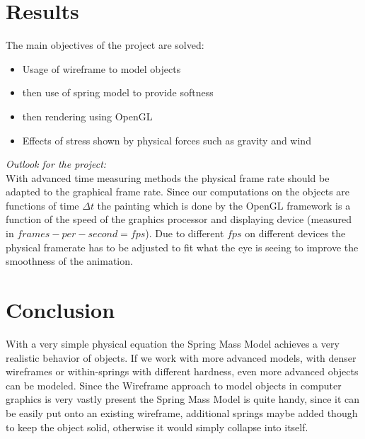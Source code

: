 \documentclass[11pt]{article}
\begin{document}
\section{Results}
The main objectives of the project are solved:
\begin{itemize}
\item{Usage of wireframe to model objects}
\item{then use of spring model to provide softness}
\item{then rendering using OpenGL}
\item{Effects of stress shown by physical forces such as gravity and wind}
\end{itemize}

\textit{Outlook for the project:}\\
With advanced time measuring methods the physical frame rate should be adapted to the graphical frame rate. Since our computations on the objects are functions of time $\Delta t$ the painting which is done by the OpenGL framework is a function of the speed of the graphics processor and displaying device (measured in $frames-per-second=fps$). Due to different $fps$ on different devices the physical framerate has to be adjusted to fit what the eye is seeing to improve the smoothness of the animation.\\[1em]
%

\section{Conclusion}
With a very simple physical equation the Spring Mass Model achieves a very realistic behavior of objects. If we work with more advanced models, with denser wireframes or within-springs with different hardness, even more advanced objects can be modeled. Since the Wireframe approach to model objects in computer graphics is very vastly present the Spring Mass Model is quite handy, since it can be easily put onto an existing wireframe, additional springs maybe added though to keep the object solid, otherwise it would simply collapse into itself.
%


%
%
\newpage
\nocite{hill}
\nocite{rogersadams}
\nocite{dam}
\nocite{PBDM}
\nocite{baker}
\nocite{bakerGL}
\nocite{IASDO}
\nocite{LSCS}
\nocite{DCMSM}
\nocite{gama}
\nocite{wiki}
\nocite{hair}



%
%
\end{document}
